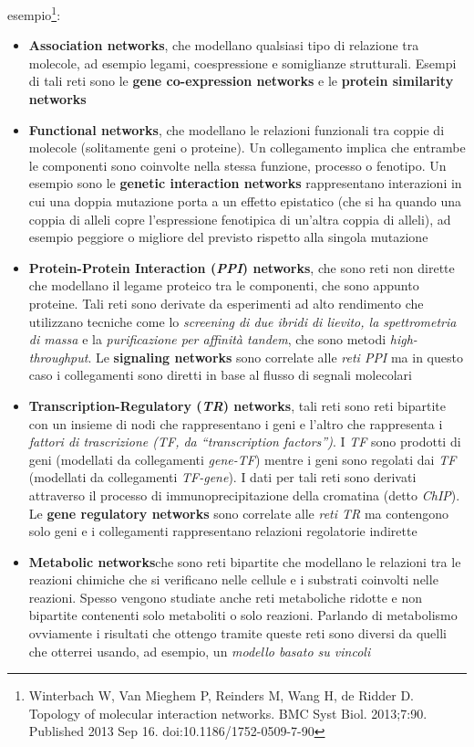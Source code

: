 \documentclass[a4paper,12pt, oneside]{book}
\begin{document}
esempio\footnote{Winterbach W, Van Mieghem P, Reinders M, Wang H, de Ridder
  D. Topology of molecular interaction networks. BMC Syst
  Biol. 2013;7:90. Published 2013 Sep 16. doi:10.1186/1752-0509-7-90}: 
\begin{itemize}
  \item \textbf{Association networks}, che modellano qualsiasi tipo di relazione
  tra molecole, ad esempio legami, coespressione e somiglianze
  strutturali. Esempi di tali reti sono le \textbf{gene co-expression networks}
  e le \textbf{protein similarity networks} 
  \item \textbf{Functional networks}, che modellano le relazioni funzionali tra
  coppie di molecole (solitamente geni o proteine). Un collegamento implica che
  entrambe le componenti sono coinvolte nella stessa funzione, processo o
  fenotipo. Un esempio sono le \textbf{genetic interaction networks}
  rappresentano interazioni in cui una doppia mutazione 
  porta a un effetto epistatico (che si ha quando una coppia di alleli copre
  l'espressione fenotipica di un'altra coppia di alleli), ad esempio peggiore o
  migliore del previsto rispetto alla singola mutazione 
  \item \textbf{Protein-Protein Interaction (\textit{PPI}) networks}, che sono
  reti non dirette che modellano il legame proteico tra le componenti, che sono
  appunto proteine. Tali reti sono derivate da esperimenti ad alto rendimento
  che utilizzano tecniche come lo \textit{screening di due ibridi di lievito, la
    spettrometria di massa} e la \textit{purificazione per affinità tandem}, che
  sono metodi \textit{high-throughput}. Le
  \textbf{signaling networks} sono correlate alle \textit{reti PPI}
  ma in questo caso i collegamenti sono diretti in base al flusso di segnali
  molecolari
  \item \textbf{Transcription-Regulatory (\textit{TR}) networks}, tali reti sono
  reti bipartite con un insieme di nodi che rappresentano i geni e l'altro che
  rappresenta i \textit{fattori di trascrizione (TF, da ``transcription
    factors'')}. I \textit{TF} sono prodotti di geni (modellati da collegamenti
  \textit{gene-TF}) mentre i geni sono regolati dai \textit{TF} (modellati da
  collegamenti \textit{TF-gene}). I dati per tali reti sono derivati attraverso
  il processo di immunoprecipitazione della cromatina (detto \textit{ChIP}). Le
  \textbf{gene regulatory networks} sono correlate alle \textit{reti TR} ma
  contengono solo geni e i collegamenti rappresentano relazioni regolatorie
  indirette 
  \item \textbf{Metabolic networks}che sono reti bipartite che modellano le
  relazioni tra le reazioni chimiche che si verificano nelle cellule e i
  substrati coinvolti nelle reazioni. Spesso vengono studiate anche reti
  metaboliche ridotte e non bipartite contenenti solo metaboliti o solo
  reazioni. Parlando di metabolismo ovviamente i risultati che ottengo tramite
  queste reti sono diversi da quelli che otterrei usando, ad esempio, un
  \textit{modello basato su vincoli}
\end{itemize}
\end{document}
